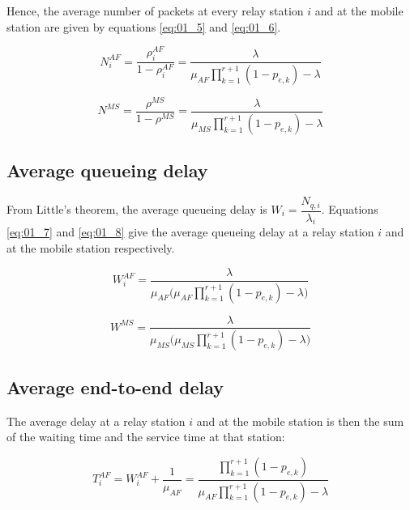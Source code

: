 Hence, the average number of packets at every relay station $i$ and at the
mobile station are given by equations \ref{eq:01_5} and \ref{eq:01_6}.

\begin{equation}
  N_i^{AF} = \dfrac{\rho_i^{AF}}{1 - \rho_i^{AF}} = \dfrac{\lambda}{\mu_{AF}\prod\limits_{k=1}^{r+1} (1 - p_{e,k}) - \lambda}
  \label{eq:01_5}
\end{equation}

\begin{equation}
  N^{MS} =  \dfrac{\rho^{MS}}{1 - \rho^{MS}} = \dfrac{\lambda}{\mu_{MS}\prod\limits_{k=1}^{r+1} (1 - p_{e,k}) - \lambda}
  \label{eq:01_6}
\end{equation}


\subsection{Average queueing delay}

From Little's theorem, the average queueing delay is $W_i = \dfrac{N_{q,i}}{\lambda_i}$.
Equations \ref{eq:01_7} and \ref{eq:01_8} give the average queueing delay at a
relay station $i$ and at the mobile station respectively.

\begin{equation}
  W_i^{AF} = \dfrac{\lambda}{\mu_{AF} \Big(\mu_{AF}\prod\limits_{k=1}^{r+1} (1 - p_{e,k}) - \lambda\Big)}
  \label{eq:01_7}
\end{equation}

\begin{equation}
  W^{MS} = \dfrac{\lambda}{\mu_{MS} \Big(\mu_{MS}\prod\limits_{k=1}^{r+1} (1 - p_{e,k}) - \lambda\Big)}
  \label{eq:01_8}
\end{equation}


\subsection{Average end-to-end delay}

The average delay at a relay station $i$ and at the mobile station is then the
sum of the waiting time and the service time at that station:

\begin{equation}
  T_i^{AF} = W_i^{AF} + \dfrac{1}{\mu_{AF}} =
  \dfrac{\prod\limits_{k=1}^{r+1} (1 - p_{e,k})}{\mu_{AF}\prod\limits_{k=1}^{r+1} (1 - p_{e,k}) -\lambda}
  \label{eq:01_9}
\end{equation}

